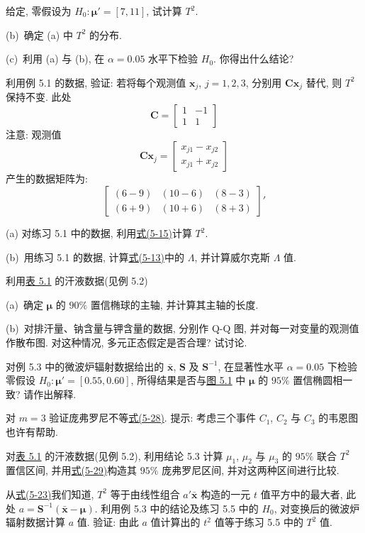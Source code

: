 给定, 零假设为 $H_0:\boldsymbol{\mu}'=[7,11]$, 试计算 $T^2$.

(b)\ 确定 (a) 中 $T^2$ 的分布.

(c)\ 利用 (a) 与 (b), 在 $\alpha=0.05$ 水平下检验 $H_0$. 你得出什么结论?

\quad 利用例 5.1 的数据, 验证: 若将每个观测值 $\mathbf{x}_j$, $j=1,2,3$, 分别用 $\mathbf{C}\mathbf{x}_j$ 替代, 则 $T^2$ 保持不变. 此处
\[
\mathbf{C}=\begin{bmatrix}1&-1\\1&1\end{bmatrix}
\]
注意: 观测值
\[
\mathbf{C}\mathbf{x}_j=\begin{bmatrix}x_{j1}-x_{j2}\\x_{j1}+x_{j2}\end{bmatrix}
\]
产生的数据矩阵为:
\[
\begin{bmatrix}
(6-9)&(10-6)&(8-3)\\
(6+9)&(10+6)&(8+3)
\end{bmatrix}'
\]

\quad (a) 对练习 5.1 中的数据, 利用\hyperref[eq:5-15]{式(5-15)}计算 $T^2$.

(b)\ 用练习 5.1 的数据, 计算\hyperref[eq:5-13]{式(5-13)}中的 $\Lambda$, 并计算威尔克斯 $\Lambda$ 值.

\quad 利用\hyperref[tab:5.1]{表 5.1} 的汗液数据(见例 5.2)

(a)\ 确定 $\boldsymbol{\mu}$ 的 $90\%$ 置信椭球的主轴, 并计算其主轴的长度.

(b)\ 对排汗量、钠含量与钾含量的数据, 分别作 Q-Q 图, 并对每一对变量的观测值作散布图. 对这种情况, 多元正态假定是否合理? 试讨论.

\quad 对例 5.3 中的微波炉辐射数据给出的 $\bar{\mathbf{x}}$, $\mathbf{S}$ 及 $\mathbf{S}^{-1}$, 在显著性水平 $\alpha=0.05$ 下检验零假设 $H_0:\boldsymbol{\mu}'=[0.55,0.60]$, 所得结果是否与\hyperref[fig:5.1]{图 5.1} 中 $\boldsymbol{\mu}$ 的 $95\%$ 置信椭圆相一致? 请作出解释.

\quad 对 $m=3$ 验证庞弗罗尼不等\hyperref[eq:5-28]{式(5-28)}. 提示: 考虑三个事件 $C_1$, $C_2$ 与 $C_3$ 的韦恩图也许有帮助.

\quad 对\hyperref[tab:5.1]{表 5.1} 的汗液数据(见例 5.2), 利用结论 5.3 计算 $\mu_1$, $\mu_2$ 与 $\mu_3$ 的 $95\%$ 联合 $T^2$ 置信区间, 并用\hyperref[eq:5-29]{式(5-29)}构造其 $95\%$ 庞弗罗尼区间, 并对这两种区间进行比较.

\quad 从\hyperref[eq:5-23]{式(5-23)}我们知道, $T^2$ 等于由线性组合 $a'\bar{\mathbf{x}}$ 构造的一元 $t$ 值平方中的最大者, 此处 $a=\mathbf{S}^{-1}(\bar{\mathbf{x}}-\boldsymbol{\mu})$. 利用例 5.3 中的结论及练习 5.5 中的 $H_0$, 对变换后的微波炉辐射数据计算 $a$ 值. 验证: 由此 $a$ 值计算出的 $t^2$ 值等于练习 5.5 中的 $T^2$ 值.

